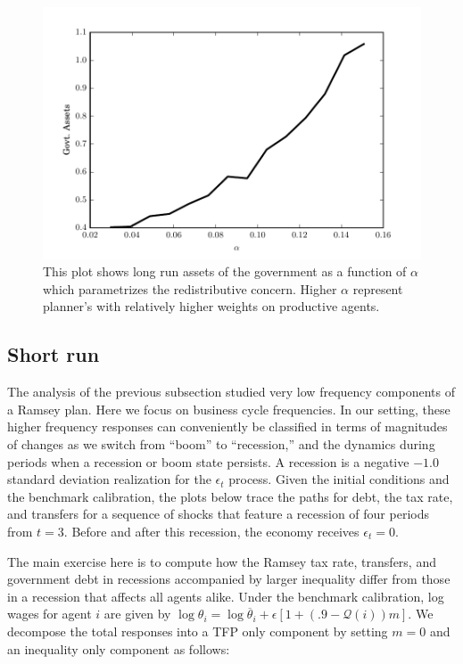 \documentclass[thmsb,11pt]{article}
\begin{document}
 {
  \begin{figure}
  \label{fig: comp_stats_alpha}
    \centering
    \includegraphics[width = .9\textwidth]{cesplots/comp_stats_alpha.pdf}
    \caption{This plot shows long run assets of the government as a function of $\alpha$ which parametrizes the redistributive concern. Higher $\alpha$ represent planner's with relatively higher weights on productive agents.}
  \end{figure}

}




\subsection{Short run}
The analysis of the previous subsection studied  very low
frequency components of  a Ramsey plan. Here  we focus on business cycle frequencies.
 In our setting,  these higher frequency responses can conveniently be classified  in terms of  magnitudes of changes as we switch from ``boom''
to ``recession,'' and the dynamics during  periods when a recession or boom state persists. A recession is a negative $-1.0$ standard deviation realization for the $\epsilon_t$ process. Given the initial conditions and the benchmark calibration, the plots below trace the paths
for debt, the tax rate,  and transfers for a sequence of shocks that feature a recession of four periods from $t=3$. Before and after this recession, the economy receives $\epsilon_t=0$.

The main exercise here is to compute how the Ramsey tax rate, transfers, and government debt in recessions accompanied by larger inequality differ from those
in a recession that affects all agents alike. Under the benchmark calibration, log wages for agent $i$
are given by $\log \theta_i=\log \overline{\theta}_i+\epsilon [1+(.9-\mathcal{Q}(i))m]$. We decompose the total responses into a
 TFP only component by setting $m=0$ and an inequality only component as follows:
\end{document}
